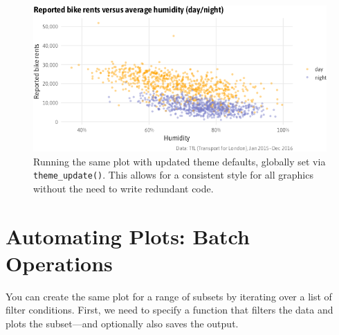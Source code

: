 \documentclass[
]{krantz}
\begin{document}
\begin{figure}
\centering
\includegraphics{bookdown_files/figure-latex/06examplePlotThemeUpdate-1.png}
\caption{\label{fig:06examplePlotThemeUpdate}Running the same plot with updated theme defaults, globally set via \texttt{theme\_update()}. This allows for a consistent style for all graphics without the need to write redundant code.}
\end{figure}

\hypertarget{automating-plots-batch-operations}{%
\section{Automating Plots: Batch Operations}\label{automating-plots-batch-operations}}

You can create the same plot for a range of subsets by iterating over a list of filter conditions. First, we need to specify a function that filters the data and plots the subset---and optionally also saves the output.
\end{document}
